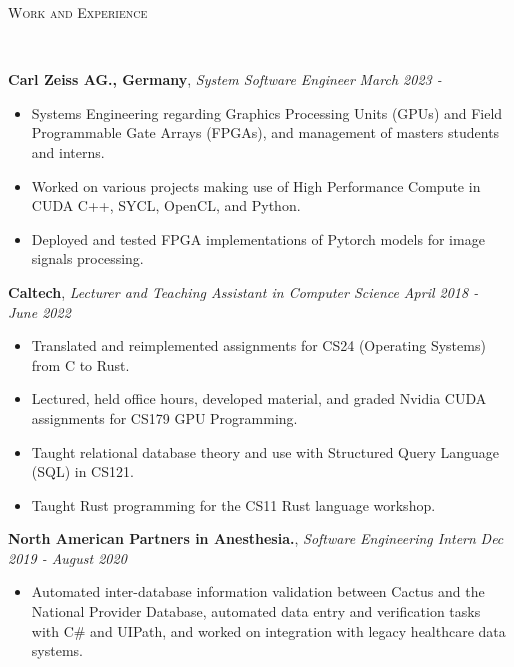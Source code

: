 \documentclass[8pt]{article}
\newenvironment{changemargin}[2]{%
  \begin{list}{}{%
    \setlength{\topsep}{0pt}%
    \setlength{\leftmargin}{#1}%
    \setlength{\rightmargin}{#2}%
    \setlength{\listparindent}{\parindent}%
    \setlength{\itemindent}{\parindent}%
    \setlength{\parsep}{\parskip}%
  }%
  \item[]}{\end{list}
}
\newcommand{\lineover}{
	\begin{changemargin}{-0.05in}{-0.05in}
		\vspace*{-8pt}
		\hrulefill \\
		\vspace*{-2pt}
	\end{changemargin}
}
\newcommand{\header}[1]{
	\begin{changemargin}{-0.5in}{-0.5in}
		\scshape{#1}\\
  	\lineover
	\end{changemargin}
}
\newenvironment{body} {
	\vspace*{-16pt}
	\begin{changemargin}{-0.25in}{-0.5in}
  }	
	{\end{changemargin}
}
\begin{document}
\header{Work and Experience}
\begin{body}
	\vspace{12pt}
	\textbf{Carl Zeiss AG., Germany}, \emph{System Software Engineer} \hfill \emph{March 2023 - }\\
	\vspace*{-4pt}
	\begin{itemize} \itemsep -0pt %
		\item Systems Engineering regarding Graphics Processing Units (GPUs) and Field Programmable Gate Arrays (FPGAs), and management of masters students and interns.
		\item Worked on various projects making use of High Performance Compute in CUDA C++, SYCL, OpenCL, and Python.
		\item Deployed and tested FPGA implementations of Pytorch models for image signals processing. 
	\end{itemize}
	\vspace*{-4pt}
 
	\textbf{Caltech}, \emph{Lecturer and Teaching Assistant in Computer Science} \hfill \emph{April 2018 - June 2022}\\
	\vspace*{-4pt}
	\begin{itemize} \itemsep -0pt %
		\item Translated and reimplemented assignments for CS24 (Operating
		Systems) from C to Rust.
		\item Lectured, held office hours, developed material, and graded Nvidia CUDA assignments for CS179 GPU Programming.
		\item Taught relational database theory and use with Structured Query Language
		      (SQL) in CS121.
		\item Taught Rust programming for the CS11 Rust language workshop.
	\end{itemize}
	\vspace*{-4pt}

	\textbf{North American Partners in Anesthesia.}, \emph{Software Engineering Intern} \hfill
	\emph{Dec 2019 - August 2020}\\
	\vspace*{-3pt}
	\begin{itemize} \itemsep -0pt %
		\item Automated inter-database information validation between Cactus and the
		      National Provider Database, automated data entry and verification tasks with C\# and UIPath, and worked on integration with legacy healthcare data systems.
	\end{itemize}
	\vspace*{-4pt}


\end{body}
\end{document}
